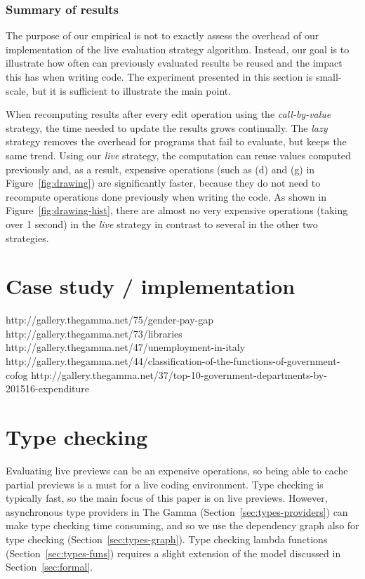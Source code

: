 \documentclass[acmsmall,anonymous,fleqn]{acmart}\settopmatter{printfolios=false,printccs=false,printacmref=false}
\theoremstyle{plain}
\theoremstyle{definition}
\begin{document}
\subsubsection{Summary of results}
The purpose of our empirical is not to exactly assess the overhead of our implementation
of the live evaluation strategy algorithm. Instead, our goal is to
illustrate how often can previously evaluated results be reused and the impact this has when
writing code. The experiment presented in this section is small-scale, but it is sufficient
to illustrate the main point.

When recomputing results after every edit operation
using the \emph{call-by-value} strategy, the time needed to update the results grows
continually. The \emph{lazy} strategy removes the overhead for programs that fail to evaluate, but
keeps the same trend. Using our \emph{live} strategy, the computation can reuse values computed
previously and, as a result, expensive operations (such as (d) and (g) in Figure~\ref{fig:drawing})
are significantly faster, because they do not need to recompute operations done previously when
writing the code. As shown in Figure~\ref{fig:drawing-hist}, there are almost no very expensive
operations (taking over 1 second) in the \emph{live} strategy in contrast to several in the
other two strategies.


\newpage

\section{Case study / implementation}
\label{sec:case}

http://gallery.thegamma.net/75/gender-pay-gap
http://gallery.thegamma.net/73/libraries
http://gallery.thegamma.net/47/unemployment-in-italy
http://gallery.thegamma.net/44/classification-of-the-functions-of-government-cofog
http://gallery.thegamma.net/37/top-10-government-departments-by-201516-expenditure


\section{Type checking}
\label{sec:types}

Evaluating live previews can be an expensive operations, so being able to cache partial previews
is a must for a live coding environment. Type checking is typically fast, so the main focus of
this paper is on live previews. However, asynchronous type providers in The Gamma (Section~\ref{sec:types-providers})
can make type checking time consuming, and so we use the dependency graph also for type checking
(Section~\ref{sec:types-graph}). Type checking lambda functions (Section~\ref{sec:types-funs})
requires a slight extension of the model discussed in Section~\ref{sec:formal}.
\end{document}
